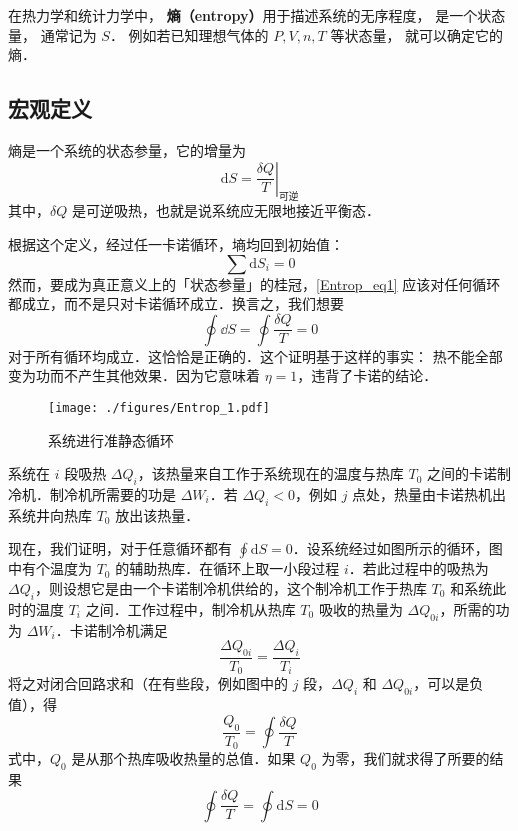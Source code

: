 
在热力学和统计力学中， \textbf{熵（entropy）}用于描述系统的无序程度， 是一个状态量， 通常记为 $S$． 例如若已知理想气体的 $P, V, n, T$ 等状态量， 就可以确定它的熵．

\subsection{宏观定义}

熵是一个系统的状态参量，它的增量为
\begin{equation}
\mathrm{d} S = \left . \frac{\delta Q}{T}\right |_{\text{可逆}}
\end{equation}
其中，$\delta Q$ 是可逆吸热，也就是说系统应无限地接近平衡态．

根据这个定义，经过任一卡诺循环，墒均回到初始值：
\begin{equation} \label{Entrop_eq1}
\sum{\text{d}S_i=0}
\end{equation}
然而，要成为真正意义上的「状态参量」的桂冠，\autoref{Entrop_eq1} 应该对任何循环都成立，而不是只对卡诺循环成立．换言之，我们想要
\begin{equation}
\oint \dd S =\oint \frac{\delta Q}{T}=0
\end{equation}
对于所有循环均成立．这恰恰是正确的．这个证明基于这样的事实： 热不能全部变为功而不产生其他效果．因为它意味着 $\eta=1$，违背了卡诺的结论．

\begin{figure}[ht]
\centering
\texttt{[image: ./figures/Entrop\_1.pdf]}
\caption{系统进行准静态循环} \label{Entrop_fig1}
\end{figure}

系统在 $i$ 段吸热 $\Delta Q_i$，该热量来自工作于系统现在的温度与热库 $T_0$ 之间的卡诺制冷机．制冷机所需要的功是 $\Delta W_i$．若 $\Delta Q_i<0$，例如 $j$ 点处，热量由卡诺热机出系统井向热库 $T_0$ 放出该热量．

现在，我们证明，对于任意循环都有 $\oint \mathrm d S =0 $．设系统经过如图所示的循环，图中有个温度为 $T_0$ 的辅助热库．在循环上取一小段过程 $i$．若此过程中的吸热为 $\Delta Q_i$，则设想它是由一个卡诺制冷机供给的，这个制冷机工作于热库 $T_0$ 和系统此时的温度 $T_i$ 之间．工作过程中，制冷机从热库 $T_0$ 吸收的热量为 $\Delta Q_{0i}$，所需的功为 $\Delta W_i$．卡诺制冷机满足
\begin{equation}
\frac{\Delta Q_{0i}}{T_0}=\frac{\Delta Q_i}{T_i}
\end{equation}
将之对闭合回路求和（在有些段，例如图中的 $j$ 段，$\Delta Q_i$ 和 $\Delta Q_{0i}$，可以是负值），得
\begin{equation}
\frac{Q_0}{T_0}=\oint{\frac{\delta Q}{T}}
\end{equation}
式中，$Q_0$ 是从那个热库吸收热量的总值．如果 $Q_0$ 为零，我们就求得了所要的结果
\begin{equation}
\oint{\frac{\delta Q}{T}=\oint{\text{d}S=0}}
\end{equation}

